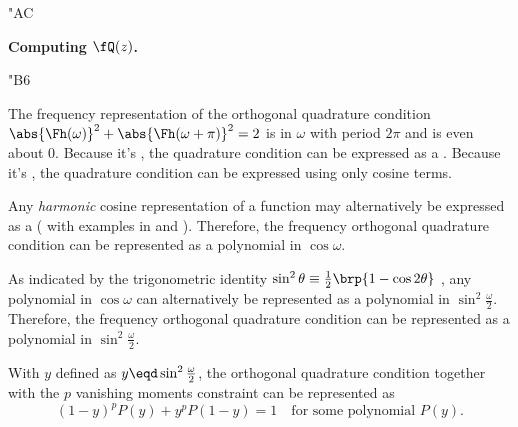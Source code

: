 \begin{dingautolist}{"AC}
  \item \textbf{Computing $\fQ(z)$.}
    \begin{dingautolist}{"B6}

      \item The frequency representation of the orthogonal quadrature condition 
            $\abs{\Fh(\omega)}^2  + \abs{\Fh(\omega+\pi)}^2 = 2$ 
             is  in $\omega$ with 
            period $2\pi$ and is even about $0$.
            Because it's , the quadrature condition can be expressed
            as a  .
            Because it's , the quadrature condition can be expressed 
            using only cosine terms.
      
      \item Any \emph{harmonic} cosine representation of a function may alternatively be 
            expressed as a  
            ( with examples in  and ).
            Therefore, the frequency orthogonal quadrature condition can be represented 
            as a polynomial in $\cos\omega$.
      
      \item As indicated by the trigonometric identity 
            $\sin^2\theta\equiv\frac{1}{2}\brp{1-\cos2\theta}$
            ,
            any polynomial in $\cos\omega$ can alternatively be represented as 
            a polynomial in $\sin^2\frac{\omega}{2}$.
            Therefore, the frequency orthogonal quadrature condition can be represented 
            as a polynomial in $\sin^2\frac{\omega}{2}$.
      
      \item With $y$ defined as $y\eqd\sin^2\frac{\omega}{2}$,
            the orthogonal quadrature condition together with the $p$ vanishing moments
            constraint can be represented as 
            \[(1-y)^p P(y) + y^p P(1-y) = 1 \quad \text{for some polynomial $P(y)$}.\]
            

\end{dingautolist}
\end{dingautolist}
